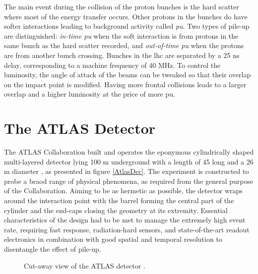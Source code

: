 The main event during the collision of the proton bunches is the hard scatter where most of the energy transfer occurs. Other protons in the bunches do have softer interactions leading to background activity called \textit{\gls{pu}}. Two types of pile-up are distinguished: \textit{in-time \gls{pu}} when the soft interaction is from protons in the same bunch as the hard scatter recorded, and \textit{out-of-time \gls{pu}} when the protons are from another bunch crossing. Bunches in the \gls{lhc} are separated by a 25 ns delay, corresponding to a machine frequency of 40 MHz. To control the luminosity, the angle of attack of the beams can be tweaked so that their overlap on the impact point is modified. Having more frontal collisions leads to a larger overlap and  a higher luminosity at the price of more \gls{pu}. 

\section{The ATLAS Detector}\label{sec-ATLASDet}
The ATLAS Collaboration built and operates the eponymous cylindrically shaped multi-layered detector lying 100 m underground with a length of 45 long and a 26 m diameter \cite{TheATLASCollaboration_2008}, as presented in figure \ref{AtlasDec}. The experiment is constructed to probe a braod range of physical phenomena, as required from the general purpose of the Collaboration. Aiming to be as hermetic as possible, the detector wraps around the interaction point with the barrel forming the central part of the cylinder and the end-caps closing the geometry at its extremity. Essential characteristics of the design had to be met to manage the extremely high event rate, requiring fast response, radiation-hard sensors, and state-of-the-art readout electronics in combination with good spatial and temporal resolution to disentangle the effect of pile-up. 

\begin{figure}[!h]
\centering
\hspace{-1.25cm}
\caption{Cut-away view of the ATLAS detector \cite{ATLASschematics}.}
\label{fig-AtlasDec}
\end{figure}


